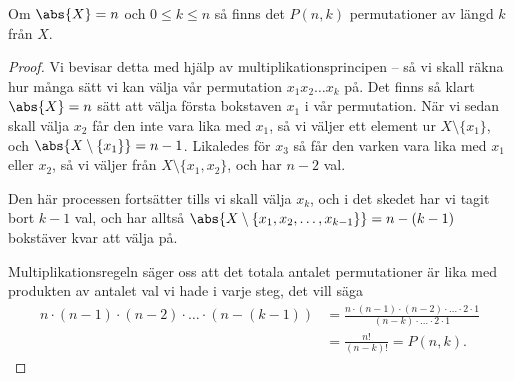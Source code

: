 \documentclass{tufte-handout}
\begin{document}
\begin{proposition}\label{prop_Pnk_counts_permutations}
Om $\abs{X}=n$ och $0 \leq k \leq n$ så finns det $P(n,k)$ permutationer av längd $k$ från $X$.
\begin{proof}
Vi bevisar detta med hjälp av multiplikationsprincipen -- så vi skall räkna hur många sätt vi kan välja vår permutation $x_1x_2\ldots x_k$ på. Det finns så klart $\abs{X} = n$ sätt att välja första bokstaven $x_1$ i vår permutation. När vi sedan skall välja $x_2$ får den inte vara lika med $x_1$, så vi väljer ett element ur $X \setminus \{x_1\}$, och $\abs{X\setminus\{x_1\}} = n-1$. Likaledes för $x_3$ så får den varken vara lika med $x_1$ eller $x_2$, så vi väljer från $X\setminus \{x_1, x_2\}$, och har $n-2$ val.

Den här processen fortsätter tills vi skall välja $x_k$, och i det skedet har vi tagit bort $k-1$ val, och har alltså $\abs{X \setminus \{x_1, x_2, \ldots, x_{k-1}\}} = n - (k-1)$ bokstäver kvar att välja på.

Multiplikationsregeln säger oss att det totala antalet permutationer är lika med produkten av antalet val vi hade i varje steg, det vill säga
\begin{align*}
	n\cdot(n-1)\cdot(n-2)\cdot\ldots\cdot(n-(k-1)) &= \frac{n\cdot(n-1)\cdot(n-2)\cdot\ldots\cdot2\cdot1}{(n-k)\cdot\ldots\cdot2\cdot1}\\
	&= \frac{n!}{(n-k)!} = P(n,k).
\end{align*}
\end{proof}
\end{proposition}
\end{document}
